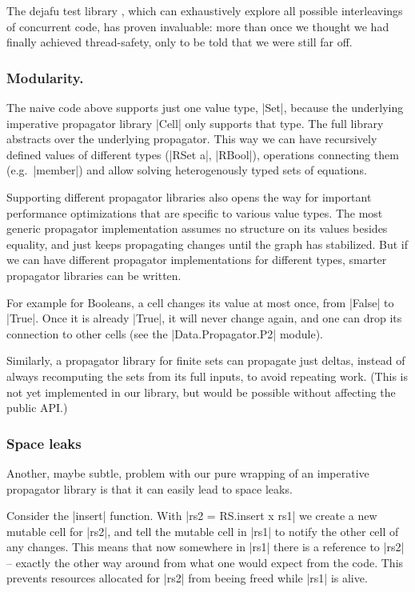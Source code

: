 \documentclass[manuscript,anonymous,screen,acmsmall]{acmart}
\begin{document}
The dejafu test library \citep{dejafu}, which can exhaustively explore all possible interleavings of concurrent code, has proven invaluable: more than once we thought we had finally achieved thread-safety, only to be told that we were still far off.

\subsubsection{Modularity.}

The naive code above supports just one value type, |Set|, because the underlying imperative propagator library |Cell| only supports that type. The full library abstracts over the underlying propagator. This way we can have recursively defined values of different types (|RSet a|, |RBool|), operations connecting them (e.g.\ |member|) and allow solving heterogenously typed sets of equations.

Supporting different propagator libraries also opens the way for important performance optimizations that are specific to various value types. The most generic propagator implementation assumes no structure on its values besides equality, and just keeps propagating changes until the graph has stabilized. But if we can have different propagator implementations for different types, smarter propagator libraries can be written.

For example for Booleans, a cell changes its value at most once, from |False| to |True|. Once it is already |True|, it will never change again, and one can drop its connection to other cells (see the |Data.Propagator.P2| module).

Similarly, a propagator library for finite sets can propagate just deltas, instead of always recomputing the sets from its full inputs, to avoid repeating work. (This is not yet implemented in our library, but would be possible without affecting the public API.)

\subsubsection{Space leaks}\label{sec:spaceleak}

Another, maybe subtle, problem with our pure wrapping of an imperative propagator library is that it can easily lead to space leaks.

Consider the |insert| function. With |rs2 = RS.insert x rs1| we create a new mutable cell for |rs2|, and tell the mutable cell in |rs1| to notify the other cell of any changes. This means that now somewhere in |rs1| there is a reference to |rs2| -- exactly the other way around from what one would expect from the code. This prevents resources allocated for |rs2| from beeing freed while |rs1| is alive.
\end{document}
